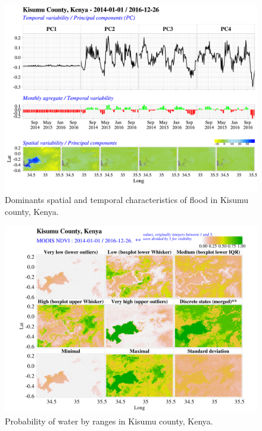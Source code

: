 \documentclass[12pt,oneside]{article}
\begin{document}
\begin{figure}
\includegraphics[width=1\linewidth]{figures/Mapping_FBFS_NDFI_PCA_plot_Kisumu} \caption{Dominants spatial and temporal characteristics of flood in Kisumu county, Kenya.}\label{fig:fig7}
\end{figure}

\begin{figure}
\includegraphics[width=1\linewidth]{figures/Mapping_FBFS_water_probability} \caption{Probability of water by ranges in Kisumu county, Kenya.}\label{fig:fig8}
\end{figure}
\end{document}
